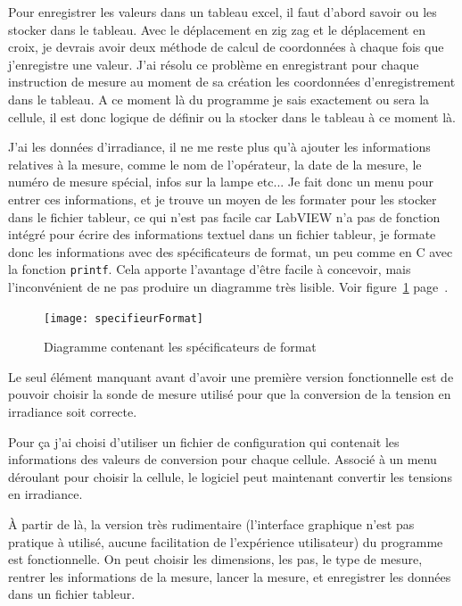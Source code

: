 \documentclass[a4paper, 12pt]{article}
\begin{document}
Pour enregistrer les valeurs dans un tableau excel, il faut d'abord savoir ou les stocker dans le tableau.  
Avec le déplacement en zig zag et le déplacement en croix, je devrais avoir deux méthode de calcul de coordonnées à chaque fois que j'enregistre une valeur.  
J'ai résolu ce problème en enregistrant pour chaque instruction de mesure au moment de sa création les coordonnées d'enregistrement dans le tableau. A ce moment là du programme je sais exactement ou sera la cellule, il est donc logique de définir ou la stocker dans le tableau à ce moment là.  
  
 J'ai les données d'irradiance, il ne me reste plus qu'à ajouter les informations relatives à la mesure, comme le nom de l'opérateur, la date de la mesure, le numéro de mesure spécial, infos sur la lampe etc...
Je fait donc un menu pour entrer ces informations, et je trouve un moyen de les formater pour les stocker dans le fichier tableur, ce qui n'est pas facile car LabVIEW n'a pas de fonction intégré pour écrire des informations textuel dans un fichier tableur, je formate donc les informations avec des spécificateurs de format, un peu comme en C avec la fonction \verb|printf|.
Cela apporte l'avantage d'être facile à concevoir, mais l'inconvénient de ne pas produire un diagramme très lisible.
Voir figure~\ref{fig:specifieurFormat} page~\pageref{fig:specifieurFormat}.

\begin{figure}[h]
	\centering
	\texttt{[image: specifieurFormat]}
	\caption{Diagramme contenant les spécificateurs de format}
	\label{fig:specifieurFormat}
\end{figure}
  
Le seul élément manquant avant d'avoir une première version fonctionnelle est de pouvoir choisir la sonde de mesure utilisé pour que la conversion de la tension en irradiance soit correcte. 

Pour ça j'ai choisi d'utiliser un fichier de configuration qui contenait les informations des valeurs de conversion pour chaque cellule. Associé à un menu déroulant pour choisir la cellule, le logiciel peut maintenant convertir les tensions en irradiance.  

À partir de là, la version très rudimentaire (l'interface graphique n'est pas pratique à utilisé, aucune facilitation de l'expérience utilisateur) du programme est fonctionnelle.
On peut choisir les dimensions, les pas, le type de mesure, rentrer les informations de la mesure, lancer la mesure, et enregistrer les données dans un fichier tableur.
\end{document}
